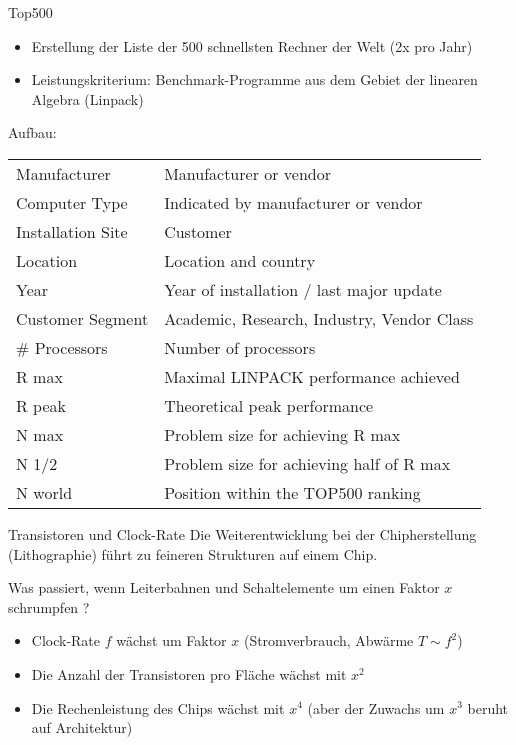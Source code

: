\begin{bonus}{Top500}
    \begin{itemize}
        \item Erstellung der Liste der 500 schnellsten Rechner der Welt (2x pro Jahr)
        \item Leistungskriterium: Benchmark-Programme aus dem Gebiet der linearen Algebra (Linpack)
    \end{itemize}
    Aufbau:\\
    \begin{tabularx}{\textwidth}{l|X}
        Manufacturer      & Manufacturer or vendor                     \\
        Computer Type     & Indicated by manufacturer or vendor        \\
        Installation Site & Customer                                   \\
        Location          & Location and country                       \\
        Year              & Year of installation / last major update   \\
        Customer Segment  & Academic, Research, Industry, Vendor Class \\
        \# Processors     & Number of processors                       \\
        R max             & Maximal LINPACK performance achieved       \\
        R peak            & Theoretical peak performance               \\
        N max             & Problem size for achieving R max           \\
        N 1/2             & Problem size for achieving half of R max   \\
        N world           & Position within the TOP500 ranking         \\
    \end{tabularx}
\end{bonus}

\begin{bonus}{Transistoren und Clock-Rate}
    Die Weiterentwicklung bei der Chipherstellung (Lithographie) führt zu feineren Strukturen auf einem Chip.
    
    Was passiert, wenn Leiterbahnen und Schaltelemente um einen Faktor $x$ schrumpfen ?
    \begin{itemize}
        \item Clock-Rate $f$ wächst um Faktor $x$ (Stromverbrauch, Abwärme $T \sim f^2$)
        \item Die Anzahl der Transistoren pro Fläche wächst mit $x^2$
        \item Die Rechenleistung des Chips wächst mit $x^4$ (aber der Zuwachs um $x^3$ beruht auf Architektur)
    \end{itemize}
\end{bonus}


